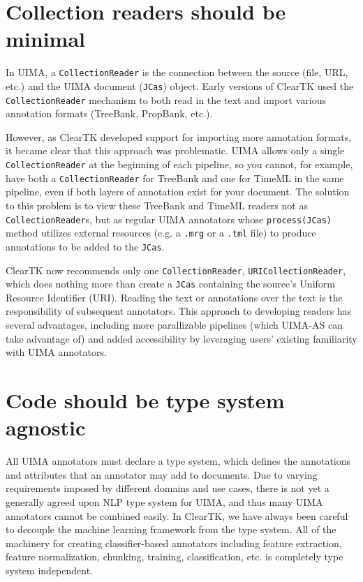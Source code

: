 \documentclass[10pt, a4paper]{article}
\newcommand{\code}[1]{\texttt{\small #1}}
\begin{document}
\section{Collection readers should be minimal}
In UIMA, a \code{CollectionReader} is the connection between the source (file, URL, etc.) and the UIMA document (\code{JCas}) object.
Early versions of ClearTK used the \code{CollectionReader} mechanism to both read in the text and import various annotation formats (TreeBank, PropBank, etc.).

However, as ClearTK developed support for importing more annotation formats, it became clear that this approach was problematic.
UIMA allows only a single \code{CollectionReader} at the beginning of each pipeline, so you cannot, for example, have both a \code{CollectionReader} for TreeBank and one for TimeML in the same pipeline, even if both layers of annotation exist for your document.
The solution to this problem is to view these TreeBank and TimeML readers not as \code{CollectionReader}s, but as regular UIMA annotators whose \code{process(JCas)} method utilizes external resources (e.g. a \code{.mrg} or a \code{.tml} file) to produce annotations to be added to the \code{JCas}.

ClearTK now recommends only one \code{CollectionReader}, \code{URICollectionReader}, which does nothing more than create a \code{JCas} containing the source's Uniform Resource Identifier (URI).
Reading the text or annotations over the text is the responsibility of subsequent annotators.
This approach to developing readers has several advantages, including more parallizable pipelines (which UIMA-AS can take advantage of) and added accessibility by leveraging users' existing familiarity with UIMA annotators.


\section{Code should be type system agnostic}
All UIMA annotators must declare a type system, which defines the annotations and attributes that an annotator may add to documents.
Due to varying requirements imposed by different domains and use cases, there is not yet a generally agreed upon NLP type system for UIMA, and thus many UIMA annotators cannot be combined easily.
In ClearTK, we have always been careful to decouple the machine learning framework from the type system. All of the machinery for creating classifier-based annotators including feature extraction, feature normalization, chunking, training, classification, etc. is completely type system independent.
\end{document}
